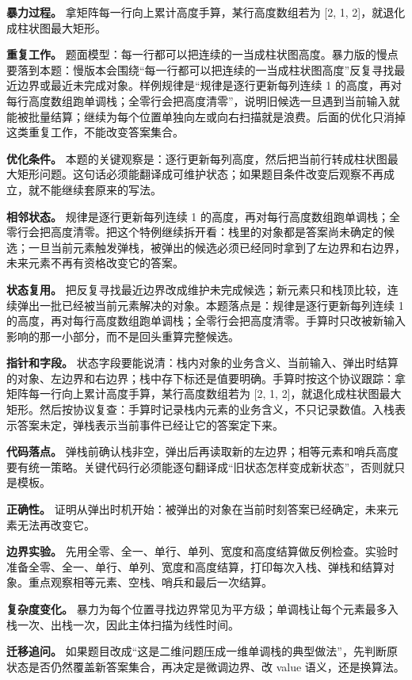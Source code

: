 \textbf{暴力过程。} 拿矩阵每一行向上累计高度手算，某行高度数组若为 [2, 1, 2]，就退化成柱状图最大矩形。

\textbf{重复工作。} 题面模型：每一行都可以把连续的一当成柱状图高度。暴力版的慢点要落到本题：慢版本会围绕“每一行都可以把连续的一当成柱状图高度”反复寻找最近边界或最近未完成对象。样例规律是“规律是逐行更新每列连续 1 的高度，再对每行高度数组跑单调栈；全零行会把高度清零”，说明旧候选一旦遇到当前输入就能被批量结算；继续为每个位置单独向左或向右扫描就是浪费。后面的优化只消掉这类重复工作，不能改变答案集合。

\textbf{优化条件。} 本题的关键观察是：逐行更新每列高度，然后把当前行转成柱状图最大矩形问题。这句话必须能翻译成可维护状态；如果题目条件改变后观察不再成立，就不能继续套原来的写法。

\textbf{相邻状态。} 规律是逐行更新每列连续 1 的高度，再对每行高度数组跑单调栈；全零行会把高度清零。把这个特例继续拆开看：栈里的对象都是答案尚未确定的候选；一旦当前元素触发弹栈，被弹出的候选必须已经同时拿到了左边界和右边界，未来元素不再有资格改变它的答案。

\textbf{状态复用。} 把反复寻找最近边界改成维护未完成候选；新元素只和栈顶比较，连续弹出一批已经被当前元素解决的对象。本题落点是：规律是逐行更新每列连续 1 的高度，再对每行高度数组跑单调栈；全零行会把高度清零。手算时只改被新输入影响的那一小部分，而不是回头重算完整候选。

\textbf{指针和字段。} 状态字段要能说清：栈内对象的业务含义、当前输入、弹出时结算的对象、左边界和右边界；栈中存下标还是值要明确。手算时按这个协议跟踪：拿矩阵每一行向上累计高度手算，某行高度数组若为 [2, 1, 2]，就退化成柱状图最大矩形。然后按协议复查：手算时记录栈内元素的业务含义，不只记录数值。入栈表示答案未定，弹栈表示当前事件已经让它的答案定下来。

\textbf{代码落点。} 弹栈前确认栈非空，弹出后再读取新的左边界；相等元素和哨兵高度要有统一策略。关键代码行必须能逐句翻译成“旧状态怎样变成新状态”，否则就只是模板。

\textbf{正确性。} 证明从弹出时机开始：被弹出的对象在当前时刻答案已经确定，未来元素无法再改变它。

\textbf{边界实验。} 先用全零、全一、单行、单列、宽度和高度结算做反例检查。实验时准备全零、全一、单行、单列、宽度和高度结算，打印每次入栈、弹栈和结算对象。重点观察相等元素、空栈、哨兵和最后一次结算。

\textbf{复杂度变化。} 暴力为每个位置寻找边界常见为平方级；单调栈让每个元素最多入栈一次、出栈一次，因此主体扫描为线性时间。

\textbf{迁移追问。} 如果题目改成“这是二维问题压成一维单调栈的典型做法”，先判断原状态是否仍然覆盖新答案集合，再决定是微调边界、改 value 语义，还是换算法。

